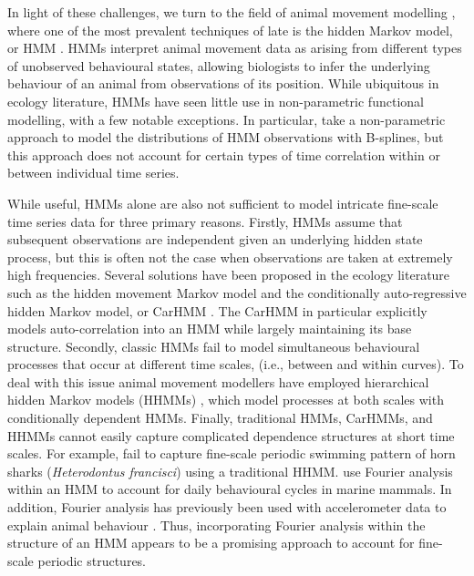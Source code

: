 In light of these challenges, we turn to the field of
animal movement modelling \citep{Hooten:2017}, where one of the most prevalent techniques of late is the hidden Markov model, or HMM \citep{Patterson:2017,McClintock:2020}. HMMs interpret animal movement data as arising from different types of unobserved behavioural states, allowing biologists to infer the underlying behaviour of an animal from observations of its position. While ubiquitous in ecology literature, HMMs have seen little use in non-parametric functional modelling, with a few notable exceptions. In particular, \citet{Langrock:2018} take a non-parametric approach to model the distributions of HMM observations with B-splines, 
but this approach does not account for certain types of time correlation within or between individual time series.

While useful, HMMs alone are also not sufficient to model intricate fine-scale time series data for three primary reasons.
%
Firstly, HMMs assume that subsequent observations are independent given an underlying hidden state process, but this is often not the case when observations are taken at extremely high frequencies. 
Several solutions have been proposed in the ecology literature such as the hidden movement Markov model \citep{Whoriskey:2016} and the conditionally auto-regressive hidden Markov model, or CarHMM \citep{Lawler:2019}. The CarHMM in particular explicitly models auto-correlation into an HMM while largely maintaining its base structure. 
%
Secondly, classic HMMs fail to model simultaneous behavioural processes that occur at different time scales, (i.e., between and within curves). 
To deal with this issue animal movement modellers have employed hierarchical hidden Markov models (HHMMs) \citep{Barajas:2017,Adam:2019}, which model processes at both scales with conditionally dependent HMMs.
%
Finally, traditional HMMs, CarHMMs, and HHMMs cannot easily capture complicated dependence structures at short time scales. For example, \citet{Adam:2019} fail to capture fine-scale periodic swimming pattern of horn sharks (\textit{Heterodontus francisci}) using a traditional HHMM. \citet{Heerah:2017} use Fourier analysis within an HMM to account for %
daily behavioural cycles in marine mammals. In addition, Fourier analysis has previously been used with accelerometer data to explain animal behaviour \citep{Fehlmann:2017,Shorter:2017}. Thus, incorporating Fourier analysis within the structure of an HMM appears to be a promising approach to account for fine-scale periodic structures.


